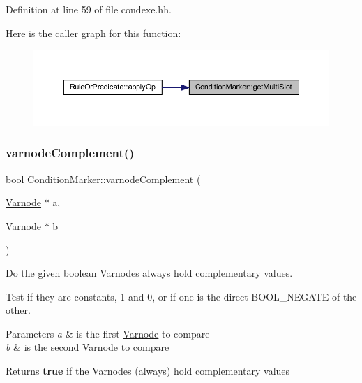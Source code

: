 Definition at line 59 of file condexe.\+hh.

Here is the caller graph for this function\+:
\nopagebreak
\begin{figure}[H]
\begin{center}
\leavevmode
\includegraphics[width=350pt]{class_condition_marker_a60a5e69db5a456966011d29dadb62a6b_icgraph}
\end{center}
\end{figure}
\mbox{\label{class_condition_marker_a51982c64eb3d581be8276d96b4735a23}} 
\subsubsection{\texorpdfstring{varnodeComplement()}{varnodeComplement()}}
{\footnotesize\ttfamily bool Condition\+Marker\+::varnode\+Complement (\begin{DoxyParamCaption}\item[{\mbox{\hyperlink{class_varnode}{Varnode}} $\ast$}]{a,  }\item[{\mbox{\hyperlink{class_varnode}{Varnode}} $\ast$}]{b }\end{DoxyParamCaption})\hspace{0.3cm}{\ttfamily [static]}}



Do the given boolean Varnodes always hold complementary values. 

Test if they are constants, 1 and 0, or if one is the direct B\+O\+O\+L\+\_\+\+N\+E\+G\+A\+TE of the other. 
\begin{DoxyParams}{Parameters}
{\em a} & is the first \mbox{\hyperlink{class_varnode}{Varnode}} to compare \\
\hline
{\em b} & is the second \mbox{\hyperlink{class_varnode}{Varnode}} to compare \\
\hline
\end{DoxyParams}
\begin{DoxyReturn}{Returns}
{\bfseries{true}} if the Varnodes (always) hold complementary values 
\end{DoxyReturn}


